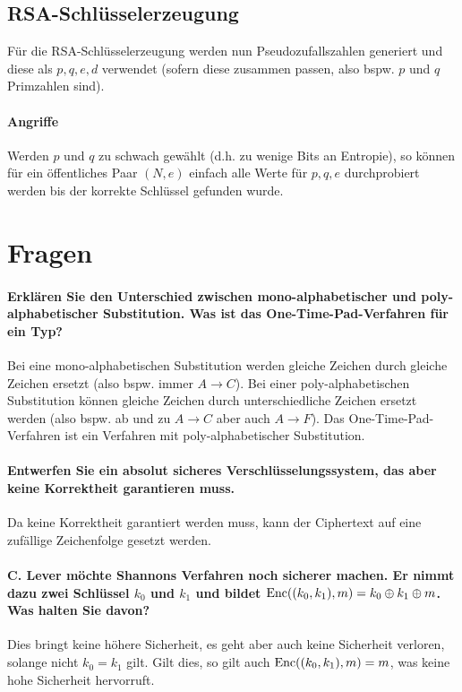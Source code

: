 		\subsection{RSA-Schlüsselerzeugung}
			Für die RSA-Schlüsselerzeugung werden nun Pseudozufallszahlen generiert und diese als \( p, q, e, d \) verwendet (sofern diese zusammen passen, also bspw. \(p\) und \(q\) Primzahlen sind).

			\paragraph{Angriffe}
				Werden \(p\) und \(q\) zu schwach gewählt (d.h. zu wenige Bits an Entropie), so können für ein öffentliches Paar \( (N, e) \) einfach alle Werte für \( p, q, e \) durchprobiert werden bis der korrekte Schlüssel gefunden wurde.

	\section{Fragen}
		\paragraph{Erklären Sie den Unterschied zwischen mono-alphabetischer und poly-alphabetischer Substitution. Was ist das One-Time-Pad-Verfahren für ein Typ?}
			Bei eine mono-alphabetischen Substitution werden gleiche Zeichen durch gleiche Zeichen ersetzt (also bspw. immer \( A \rightarrow C \)). Bei einer poly-alphabetischen Substitution können gleiche Zeichen durch unterschiedliche Zeichen ersetzt werden (also bspw. ab und zu \( A \rightarrow C \) aber auch \( A \rightarrow F \)). Das One-Time-Pad-Verfahren ist ein Verfahren mit poly-alphabetischer Substitution.

		\paragraph{Entwerfen Sie ein absolut sicheres Verschlüsselungssystem, das aber keine Korrektheit garantieren muss.}
			Da keine Korrektheit garantiert werden muss, kann der Ciphertext auf eine zufällige Zeichenfolge gesetzt werden.

		\paragraph{C. Lever möchte Shannons Verfahren noch sicherer machen. Er nimmt dazu zwei Schlüssel \(k_0\) und \(k_1\) und bildet \(\operatorname{Enc}((k_0, k_1), m) = k_0 \oplus k_1 \oplus m\). Was halten Sie davon?}
			Dies bringt keine höhere Sicherheit, es geht aber auch keine Sicherheit verloren, solange nicht \( k_0 = k_1 \) gilt. Gilt dies, so gilt auch \( \operatorname{Enc}((k_0, k_1), m) = m \), was keine hohe Sicherheit hervorruft.

